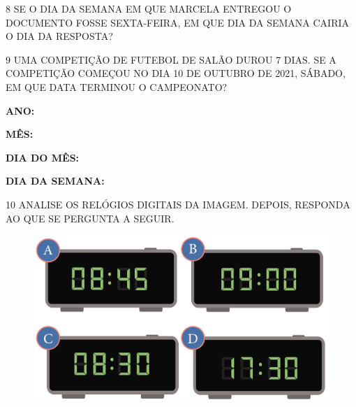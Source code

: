 
\num{8} SE O DIA DA SEMANA EM QUE MARCELA ENTREGOU O DOCUMENTO FOSSE
SEXTA-FEIRA, EM QUE DIA DA SEMANA CAIRIA O DIA DA RESPOSTA?


\num{9} UMA COMPETIÇÃO DE FUTEBOL DE SALÃO DUROU 7 DIAS.
SE A COMPETIÇÃO COMEÇOU NO DIA 10 DE OUTUBRO DE 2021, SÁBADO, EM QUE
DATA TERMINOU O CAMPEONATO?

\begin{escolha}[itemsep=-2pt]
\item \textbf{ANO:} 

\item \textbf{MÊS:} 

\item \textbf{DIA DO MÊS:} 

\item \textbf{DIA DA SEMANA:} 
\end{escolha}

\num{10} ANALISE OS RELÓGIOS DIGITAIS DA IMAGEM. DEPOIS, RESPONDA AO QUE SE PERGUNTA A SEGUIR.


\begin{figure}[htpb!]
\centering
\includegraphics[width=\textwidth]{./media/SAEB_1ANO_MAT_FIGURA56.png}
\end{figure}

